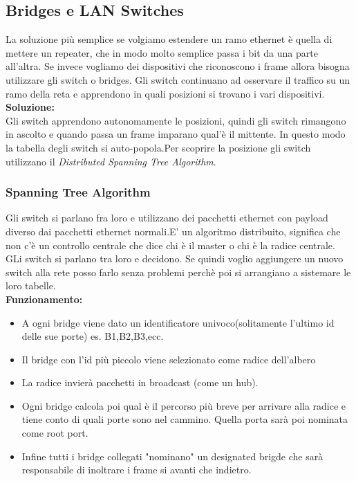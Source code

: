 \subsection{Bridges e LAN Switches}
La soluzione più semplice se volgiamo estendere un ramo ethernet è quella di mettere un repeater, che in modo molto semplice passa i bit da una parte all'altra. Se invece vogliamo dei dispositivi che riconoscono i frame allora bisogna utilizzare gli switch o bridges. Gli switch continuano ad osservare il traffico su un ramo della reta e apprendono in quali posizioni si trovano i vari dispositivi. \\
\textbf{Soluzione:} \\
Gli switch apprendono autonomamente le posizioni, quindi gli switch rimangono in ascolto e quando passa un frame imparano qual'è il mittente. In questo modo la tabella degli switch si auto-popola.Per scoprire la posizione gli switch utilizzano il \textit{Distributed Spanning Tree Algorithm}.
\subsubsection{Spanning Tree Algorithm}
Gli switch si parlano fra loro e utilizzano dei pacchetti ethernet con payload diverso dai pacchetti ethernet normali.E' un algoritmo distribuito, significa che non c'è un controllo centrale che dice chi è il master o chi è la radice centrale. GLi switch si parlano tra loro e decidono. Se quindi voglio aggiungere un nuovo switch alla rete posso farlo senza problemi perchè poi si arrangiano a sistemare le loro tabelle.\\
\textbf{Funzionamento:}\\
\begin{itemize}
  \item A ogni bridge viene dato un identificatore univoco(solitamente l'ultimo id delle sue porte) es. B1,B2,B3,ecc.
  \item Il bridge con l'id più piccolo viene selezionato come radice dell'albero
  \item La radice invierà pacchetti in broadcast (come un hub).
  \item Ogni bridge calcola poi qual è il percorso più breve per arrivare alla radice e tiene conto di quali porte sono nel cammino. Quella porta sarà poi nominata come root port.
  \item Infine tutti i bridge collegati "nominano" un designated brigde che sarà responsabile di inoltrare i frame si avanti che indietro.
\end{itemize}
